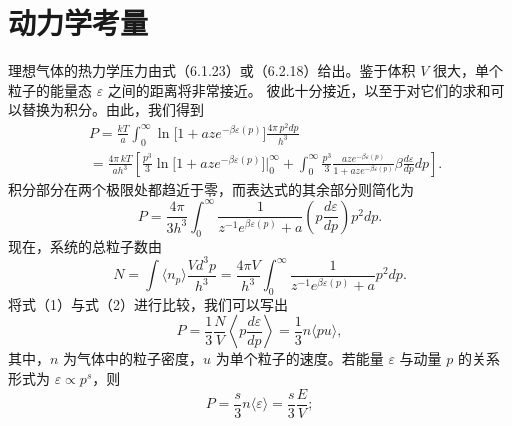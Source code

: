 \section{动力学考量}\label{ux52a8ux529bux5b66ux8003ux91cf}
理想气体的热力学压力由式（6.1.23）或（6.2.18）给出。鉴于体积 \(V\) 很大，单个粒子的能量态 \(\varepsilon\) 之间的距离将非常接近。
彼此十分接近，以至于对它们的求和可以替换为积分。由此，我们得到
\begin{equation}\tag{6.4.1}\label{eq:6.4.1}
\begin{array}{rl} & { P = \frac { k T } { a } \int _ { 0 } ^{\infty} \ln \Big [ 1 + a z e ^{- \beta \varepsilon ( p )} \Big ] \frac { 4 \pi \, p ^{2} d p } { h ^{3} } } \\& {  = \frac { 4 \pi \, k T } { a h ^{3} } \left[ \frac { p ^{3} } { 3 } \ln \Big [ 1 + a z e ^{- \beta \varepsilon ( p )} \Big ] \Big | _ { 0 } ^{\infty} + \int _ { 0 } ^{\infty} \frac { p ^{3} } { 3 } \frac { a z e ^{- \beta \varepsilon ( p )} } { 1 + a z e ^{- \beta \varepsilon ( p )} } \beta \frac { d \varepsilon } { d p } d p \right] . } \end{array}
\end{equation}
积分部分在两个极限处都趋近于零，而表达式的其余部分则简化为
\begin{equation}\tag{6.4.2}\label{eq:6.4.2}
P = \frac { 4 \pi } { 3 h ^{3} } \int _ { 0 } ^{\infty} \frac { 1 } { z ^{- 1} e ^{\beta \varepsilon ( p )} + a } \left( p \frac { d \varepsilon } { d p } \right) p ^{2} d p .
\end{equation}
现在，系统的总粒子数由
\begin{equation}\tag{6.4.3}\label{eq:6.4.3}
N = \int \langle n _ { p } \rangle \frac { V d ^{3} p } { h ^{3} } = \frac { 4 \pi V } { h ^{3} } \int _ { 0 } ^{\infty} \frac { 1 } { z ^{- 1} e ^{\beta \varepsilon ( p )} + a } p ^{2} d p .
\end{equation}
将式（1）与式（2）进行比较，我们可以写出
\begin{equation}\tag{6.4.4}\label{eq:6.4.4}
P = \frac { 1 } { 3 } \frac { N } { V } \left\langle p \frac { d \varepsilon } { d p } \right\rangle = \frac { 1 } { 3 } n \langle p u \rangle ,
\end{equation}
其中，\(n\) 为气体中的粒子密度，\(u\) 为单个粒子的速度。若能量 \(\varepsilon\) 与动量 \(p\) 的关系形式为 \(\varepsilon \propto p^{s}\)，则
\begin{equation}\tag{6.4.5}\label{eq:6.4.5}
P = \frac { s } { 3 } n \langle \varepsilon \rangle = \frac { s } { 3 } \frac { E } { V } ;
\end{equation}
